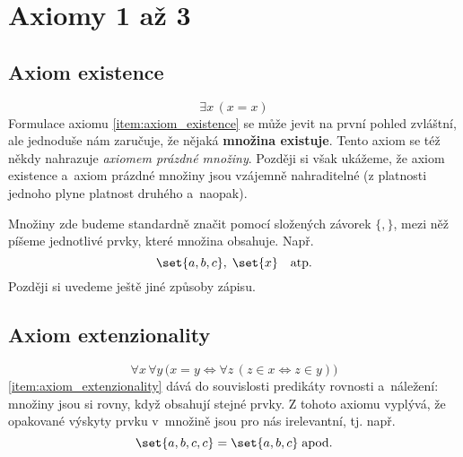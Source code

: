 \section{Axiomy 1 až 3}\label{sec:axiomy_1_az_3}
\subsection{Axiom existence}
\begin{equation*}
    \exists x\,(x=x)
\end{equation*}
Formulace axiomu \ref{item:axiom_existence} se může jevit na první pohled zvláštní, ale jednoduše nám zaručuje, že nějaká \textbf{množina existuje}. Tento axiom se též někdy nahrazuje \emph{axiomem prázdné množiny}. Později si však ukážeme, že axiom existence a~axiom prázdné množiny jsou vzájemně nahraditelné (z platnosti jednoho plyne platnost druhého a~naopak).\par
Množiny zde budeme standardně značit pomocí složených závorek $\{,\}$, mezi něž píšeme jednotlivé prvky, které množina obsahuje. Např.
\begin{equation*}
    \set{a,b,c},\;\set{x}\quad\text{atp.}
\end{equation*}
Později si uvedeme ještě jiné způsoby zápisu. 

\subsection{Axiom extenzionality}
\begin{equation*}
    \forall x\,\forall y\,\bigl(x=y \iff \forall z\,(z\in x \iff z\in y)\bigr)
\end{equation*}
\ref{item:axiom_extenzionality} dává do souvislosti predikáty rovnosti a~náležení: množiny jsou si rovny, když obsahují stejné prvky. Z tohoto axiomu vyplývá, že opakované výskyty prvku v~množině jsou pro nás irelevantní, tj. např.
\begin{equation*}
    \set{a,b,c,c}=\set{a,b,c}\;\text{apod.}
\end{equation*}

